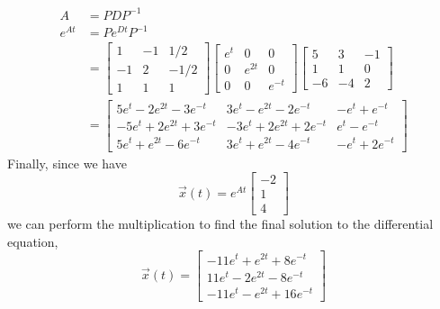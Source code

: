 \documentclass{article}
\begin{document}
\begin{equation*}
\begin{split}
    A&=PDP^{-1}\\
    e^{At}&=Pe^{Dt}P^{-1}\\
    &=
     \begin{bmatrix}
1 & -1 & 1/2\\
-1 & 2 & -1/2 \\
1 & 1 & 1
\end{bmatrix} \begin{bmatrix}
e^t & 0 & 0\\
0 & e^{2t} & 0 \\
0 & 0 & e^{-t}
\end{bmatrix} \begin{bmatrix}
5 & 3 & -1\\
1 & 1 & 0\\
-6 & -4 & 2
\end{bmatrix}\\
&=\begin{bmatrix}
5e^t-2e^{2t}-3e^{-t} & 3e^t-e^{2t}-2e^{-t} & -e^t+e^{-t}\\
-5e^t+2e^{2t}+3e^{-t} & -3e^t+2e^{2t}+2e^{-t} & e^t-e^{-t}\\
5e^t+e^{2t}-6e^{-t} & 3e^t+e^{2t}-4e^{-t} & -e^t+2e^{-t}
\end{bmatrix}
    \end{split}
\end{equation*}
Finally, since we have
\begin{equation*}
    \vec{x}(t)=e^{At}\begin{bmatrix}
-2 \\
1  \\
4 
\end{bmatrix}
\end{equation*}
we can perform the multiplication to find the final solution to the differential equation,
\begin{equation*}
    \vec{x}(t)= \begin{bmatrix}
-11e^t+e^{2t}+8e^{-t} \\
11e^t-2e^{2t}-8e^{-t}  \\
-11e^t-e^{2t}+16e^{-t} 
\end{bmatrix}
\end{equation*}
\end{document}
